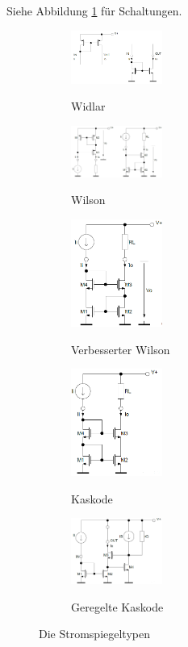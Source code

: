 Siehe Abbildung \ref{fig:stromspiegeltypen} für Schaltungen.


\begin{figure}[h]
	\centering
	\begin{subfigure}[b]{3cm}
		\centering
		{\includegraphics[width=3cm]{images/stromspiegel/widlar.png}}
		\caption{Widlar}
	\end{subfigure} \qquad	
	\begin{subfigure}[b]{3cm}
		\centering
		{\includegraphics[width=3cm]{images/stromspiegel/wilson.png}}
		\caption{Wilson}
	\end{subfigure} \qquad	
	\begin{subfigure}[b]{3cm}
		\centering
		{\includegraphics[width=3cm]{images/stromspiegel/verbesserter_wilson.png}}
		\caption{Verbesserter Wilson}
	\end{subfigure} \qquad	
	\begin{subfigure}[b]{3cm}
		\centering
		{\includegraphics[width=3cm]{images/stromspiegel/kaskode.png}}
		\caption{Kaskode}
	\end{subfigure} \qquad	
	\begin{subfigure}[b]{3cm}
		\centering
		{\includegraphics[width=3cm]{images/stromspiegel/geregelte_kaskode.png}}
		\caption{Geregelte Kaskode}
	\end{subfigure} 

	\caption{Die Stromspiegeltypen}
	\label{fig:stromspiegeltypen}
\end{figure}